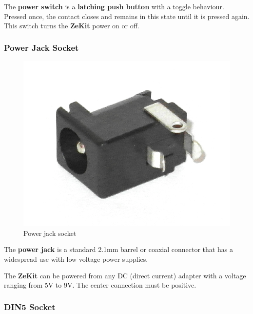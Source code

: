 \documentclass{scrartcl}
\begin{document}
The \textbf{power switch} is a \textbf{latching push button} with a toggle behaviour. \\
Pressed once, the contact closes and remains in this state until it is pressed again. \\
This switch turns the \textbf{ZeKit} power on or off.

\subsubsection{Power Jack Socket}

\begin{figure}[!ht]
    \begin{center}
        \includegraphics[scale=0.15]{assets/zekit-dcjack.jpg}
        \caption{Power jack socket}
    \end{center}
\end{figure}

The \textbf{power jack} is a standard 2.1mm barrel or coaxial connector that has a widespread use with low voltage power supplies.

The \textbf{ZeKit} can be powered from any DC (direct current) adapter with a voltage ranging from 5V to 9V. The center connection must be positive.

\subsubsection{DIN5 Socket}
\end{document}
